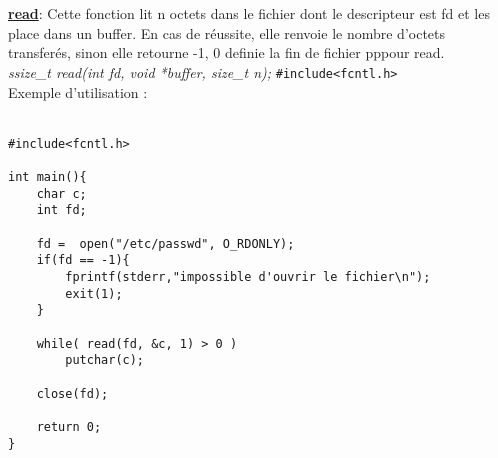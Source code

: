 \documentclass[a4paper,12pt,openany]{book}
\begin{document}
\\
\\
\underline{\textbf{read}}: Cette fonction lit n octets dans le fichier dont le descripteur est fd et les place dans un buffer. En cas de réussite, elle renvoie le nombre d'octets transferés, sinon elle retourne -1, 0 definie la fin de fichier pppour read.\\
\emph{ssize_t read(int fd, void *buffer, size_t n);} \verb+#include<fcntl.h>+\\
Exemple d'utilisation :\\
\\
\begin{verbatim}
#include<fcntl.h>

int main(){
    char c;
    int fd;

    fd =  open("/etc/passwd", O_RDONLY);
    if(fd == -1){         
        fprintf(stderr,"impossible d'ouvrir le fichier\n");
        exit(1);
    }

    while( read(fd, &c, 1) > 0 )
        putchar(c);

    close(fd);

    return 0;
}
\end{verbatim}
\end{document}
